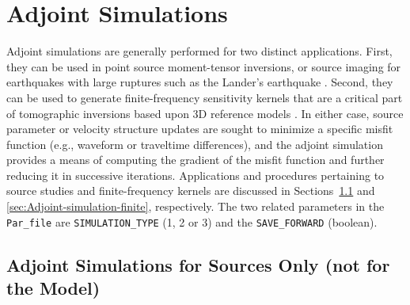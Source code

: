 \chapter{Adjoint Simulations}\label{cha:Adjoint-Simulations}

Adjoint simulations are generally performed for two distinct applications.
First, they can be used in point source moment-tensor inversions, or source imaging for
earthquakes with large ruptures such as the Lander's earthquake \citep{WaHe94}.
Second, they can be used to generate finite-frequency sensitivity
kernels that are a critical part of tomographic inversions based upon
3D reference models \citep{TrTaLi05,LiTr06,TrKoLi08,LiTr08}. In either
case, source parameter or velocity structure updates are sought to
minimize a specific misfit function (e.g., waveform or traveltime
differences), and the adjoint simulation provides a means of computing
the gradient of the misfit function and further reducing it in successive
iterations. Applications and procedures pertaining to source studies
and finite-frequency kernels are discussed in Sections~\ref{sec:Adjoint-simulation-sources}
and \ref{sec:Adjoint-simulation-finite}, respectively. The two related
parameters in the \texttt{Par\_file} are \texttt{SIMULATION\_TYPE}
(1, 2 or 3) and the \texttt{SAVE\_FORWARD} (boolean).


\section{Adjoint Simulations for Sources Only (not for the Model)}\label{sec:Adjoint-simulation-sources}

